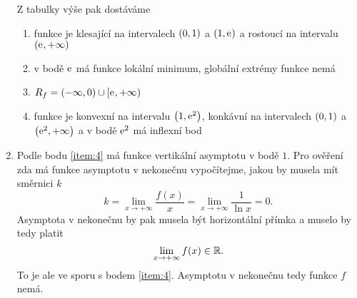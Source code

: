 \documentclass[answers]{exam}
\begin{document}
\begin{questions}
\begin{solution}
\begin{enumerate}
    		Z tabulky výše pak dostáváme
    		\begin{enumerate}
    			\item funkce je klesající na intervalech $\parens{0, 1}$ a $\parens{1, \exponential{}}$ a rostoucí na intervalu $\parens{\exponential{}, +\infty}$
    			\item v bodě $\mathrm{e}^{}$ má funkce lokální minimum, globální extrémy funkce nemá
    			\item $R_f = \parens{-\infty, 0} \cup [\exponential{}, +\infty)$
    			\item funkce je konvexní na intervalu $\parens{1,\exponential{2}}$, konkávní na intervalech $\parens{0, 1}$ a $\parens{\exponential{2}, +\infty}$ a v bodě $\mathrm{e}^{2}$ má inflexní bod
    		\end{enumerate}
    		
    		\item Podle bodu \ref{item:4} má funkce vertikální asymptotu v bodě $1$. Pro ověření zda má funkce asymptotu v nekonečnu vypočítejme, jakou by musela mít směrnici $k$
    		\begin{equation*}
    			k 
    			= 
    			\lim_{x \to +\infty} \frac{f(x)}{x}
    			=
    			\lim_{x \to +\infty} \frac{1}{\ln x}
    			=
    			0. 
    		\end{equation*}
    		Asymptota v nekonečnu by pak musela být horizontální přímka a muselo by tedy platit
    		\begin{equation*}
    		 \lim_{x \to +\infty} f(x) \in \mathbb{R}.
    		\end{equation*}
    		To je ale ve sporu s bodem \ref{item:4}. Asymptotu v nekonečnu tedy funkce $f$ nemá.
    		

\end{enumerate}
\end{solution}
\end{questions}
\end{document}
